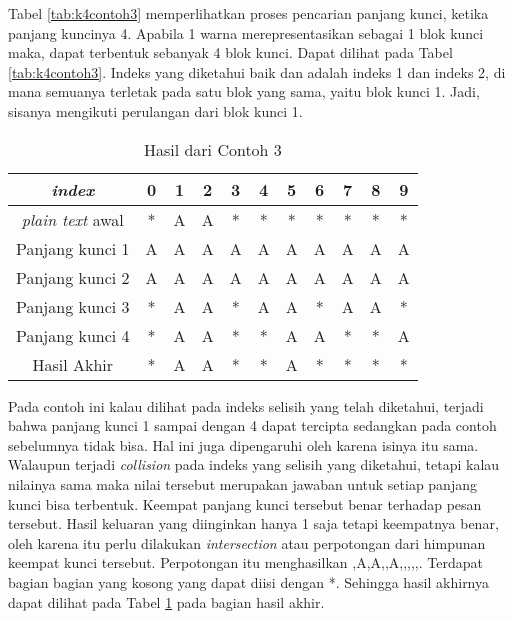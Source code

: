 	Tabel \ref{tab:k4contoh3} memperlihatkan proses pencarian panjang kunci, ketika panjang kuncinya 4. Apabila 1 warna merepresentasikan sebagai 1 blok kunci maka, dapat terbentuk sebanyak 4 blok kunci. Dapat dilihat pada Tabel \ref{tab:k4contoh3}. Indeks yang diketahui baik \plaintext dan \ciphertext adalah indeks 1 dan indeks 2, di mana semuanya terletak pada satu blok yang sama, yaitu blok kunci 1. Jadi, sisanya mengikuti perulangan dari blok kunci 1. 
	
	\begin{table}[H]
		\centering
		\caption{Hasil dari Contoh 3}
		\begin{tabular}{|c|c|c|c|c|c|c|c|c|c|c|}\hline
		\textit{index}&0&1&2&3&4&5&6&7&8&9\\ \hline	
		\textit{plain text} awal&*&A&A&*&*&*&*&*&*&*\\ \hline
		Panjang kunci 1 &A&A&A&A&A&A&A&A&A&A\\ \hline
		Panjang kunci 2 &A&A&A&A&A&A&A&A&A&A\\ \hline
		Panjang kunci 3 &*&A&A&*&A&A&*&A&A&*\\ \hline
		Panjang kunci 4 &*&A&A&*&*&A&A&*&*&A\\ \hline
		Hasil Akhir     &*&A&A&*&*&A&*&*&*&*\\ \hline
		\end{tabular}
		\label{tab:res_contoh_3}
	\end{table}
	Pada contoh ini kalau dilihat pada indeks selisih yang telah diketahui, terjadi bahwa panjang kunci 1 sampai dengan 4 dapat tercipta sedangkan pada contoh sebelumnya tidak bisa. Hal ini juga dipengaruhi oleh karena isinya itu sama. Walaupun terjadi \textit{collision} pada indeks yang selisih yang diketahui, tetapi kalau nilainya sama maka nilai tersebut merupakan jawaban untuk setiap panjang kunci bisa terbentuk. Keempat panjang kunci tersebut benar terhadap pesan tersebut. Hasil keluaran yang diinginkan hanya 1 saja tetapi keempatnya benar, oleh karena itu perlu dilakukan \textit{intersection} atau perpotongan dari himpunan keempat kunci tersebut. Perpotongan itu menghasilkan {,A,A,,A,,,,,}. Terdapat bagian bagian yang kosong yang dapat  diisi dengan *. Sehingga hasil akhirnya dapat dilihat pada Tabel \ref{tab:res_contoh_3} pada bagian hasil akhir.
	
